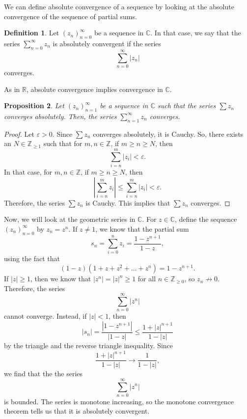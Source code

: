 \documentclass[a4paper, openany]{memoir}
\theoremstyle{definition}
\newtheorem{definition}{Definition}[section]
\theoremstyle{plain}
\newtheorem{proposition}[definition]{Proposition}
\begin{document}
We can define absolute convergence of a sequence by looking at the absolute convergence of the sequence of partial sums. 
\begin{definition}
Let $(z_n)_{n=0}^{\infty}$ be a sequence in $\mathbb{C}$. In that case, we say that the series $\sum_{n=0}^{\infty} z_n$ is absolutely convergent if the series
\[\sum_{n=0}^{\infty} |z_n|\]
converges.
\end{definition}
\noindent As in $\mathbb{R}$, absolute convergence implies convergence in $\mathbb{C}$.
\begin{proposition}
Let $(z_n)_{n=1}^{\infty}$ be a sequence in $\mathbb{C}$ such that the series $\sum z_n$ converges absolutely. Then, the series $\sum_{n=1}^{\infty} z_n$ converges.
\end{proposition}
\begin{proof}
Let $\varepsilon > 0$. Since $\sum z_n$ converges absolutely, it is Cauchy. So, there exists an $N \in \mathbb{Z}_{\geqslant 1}$ such that for $m,n \in \mathbb{Z}$, if $m \geqslant n \geqslant N$, then 
\[\sum_{i=n}^m |z_i| < \varepsilon.\]
In that case, for $m, n \in \mathbb{Z}$, if $m \geqslant n \geqslant N$, then
\[\left|\sum_{i=n}^m z_i\right| \leqslant \sum_{i=n}^m |z_i| < \varepsilon.\]
Therefore, the series $\sum z_n$ is Cauchy. This implies that $\sum z_n$ converges.
\end{proof}

Now, we will look at the geometric series in $\mathbb{C}$. For $z \in \mathbb{C}$, define the sequence $(z_n)_{n=0}^{\infty}$ by $z_n = z^n$. If $z \neq 1$, we know that the partial sum
\[s_n = \sum_{i=0}^n z_i = \frac{1 - z^{n+1}}{1 - z},\]
using the fact that
\[(1 - z)(1 + z + z^2 + \dots + z^n) = 1 - z^{n+1}.\]
If $|z| \geqslant 1$, then we know that $|z^n| = |z|^n \geqslant 1$ for all $n \in \mathbb{Z}_{\geqslant 0}$, so $z_n \not\to 0$. Therefore, the series 
\[\sum_{n=0}^{\infty} |z^n|\]
cannot converge. Instead, if $|z| < 1$, then 
\[|s_n| = \frac{|1 - z^{n+1}|}{|1 - z|} \leqslant \frac{1 + |z|^{n+1}}{1 - |z|}\]
by the triangle and the reverse triangle inequality. Since
\[\frac{1 + |z|^{n+1}}{1 - |z|} \to \frac{1}{1 - |z|},\]
we find that the the series
\[\sum_{n=0}^{\infty} |z^n|\]
is bounded. The series is monotone increasing, so the monotone convergence theorem tells us that it is absolutely convergent.
\end{document}
